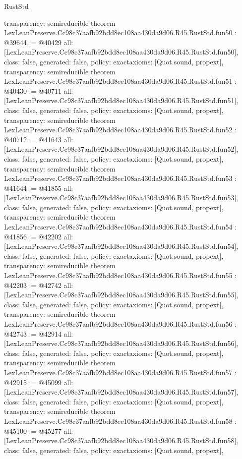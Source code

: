 \begin{lexlean}{RustStd}
\begin{coremodule}
{  transparency: semireducible
}
theorem LexLeanPreserve.Cc98c37aafb92bdd8ec108aa430da9d06.R45.RustStd.fun50 : @39644 := @40429 {
  all: [LexLeanPreserve.Cc98c37aafb92bdd8ec108aa430da9d06.R45.RustStd.fun50],
  class: false,
  generated: false,
  policy: exact{axioms: [Quot.sound, propext]},
  transparency: semireducible
}
theorem LexLeanPreserve.Cc98c37aafb92bdd8ec108aa430da9d06.R45.RustStd.fun51 : @40430 := @40711 {
  all: [LexLeanPreserve.Cc98c37aafb92bdd8ec108aa430da9d06.R45.RustStd.fun51],
  class: false,
  generated: false,
  policy: exact{axioms: [Quot.sound, propext]},
  transparency: semireducible
}
theorem LexLeanPreserve.Cc98c37aafb92bdd8ec108aa430da9d06.R45.RustStd.fun52 : @40712 := @41643 {
  all: [LexLeanPreserve.Cc98c37aafb92bdd8ec108aa430da9d06.R45.RustStd.fun52],
  class: false,
  generated: false,
  policy: exact{axioms: [Quot.sound, propext]},
  transparency: semireducible
}
theorem LexLeanPreserve.Cc98c37aafb92bdd8ec108aa430da9d06.R45.RustStd.fun53 : @41644 := @41855 {
  all: [LexLeanPreserve.Cc98c37aafb92bdd8ec108aa430da9d06.R45.RustStd.fun53],
  class: false,
  generated: false,
  policy: exact{axioms: [Quot.sound, propext]},
  transparency: semireducible
}
theorem LexLeanPreserve.Cc98c37aafb92bdd8ec108aa430da9d06.R45.RustStd.fun54 : @41856 := @42202 {
  all: [LexLeanPreserve.Cc98c37aafb92bdd8ec108aa430da9d06.R45.RustStd.fun54],
  class: false,
  generated: false,
  policy: exact{axioms: [Quot.sound, propext]},
  transparency: semireducible
}
theorem LexLeanPreserve.Cc98c37aafb92bdd8ec108aa430da9d06.R45.RustStd.fun55 : @42203 := @42742 {
  all: [LexLeanPreserve.Cc98c37aafb92bdd8ec108aa430da9d06.R45.RustStd.fun55],
  class: false,
  generated: false,
  policy: exact{axioms: [Quot.sound, propext]},
  transparency: semireducible
}
theorem LexLeanPreserve.Cc98c37aafb92bdd8ec108aa430da9d06.R45.RustStd.fun56 : @42743 := @42914 {
  all: [LexLeanPreserve.Cc98c37aafb92bdd8ec108aa430da9d06.R45.RustStd.fun56],
  class: false,
  generated: false,
  policy: exact{axioms: [Quot.sound, propext]},
  transparency: semireducible
}
theorem LexLeanPreserve.Cc98c37aafb92bdd8ec108aa430da9d06.R45.RustStd.fun57 : @42915 := @45099 {
  all: [LexLeanPreserve.Cc98c37aafb92bdd8ec108aa430da9d06.R45.RustStd.fun57],
  class: false,
  generated: false,
  policy: exact{axioms: [Quot.sound, propext]},
  transparency: semireducible
}
theorem LexLeanPreserve.Cc98c37aafb92bdd8ec108aa430da9d06.R45.RustStd.fun58 : @45100 := @45277 {
  all: [LexLeanPreserve.Cc98c37aafb92bdd8ec108aa430da9d06.R45.RustStd.fun58],
  class: false,
  generated: false,
  policy: exact{axioms: [Quot.sound, propext]},
}
\end{coremodule}
\end{lexlean}
